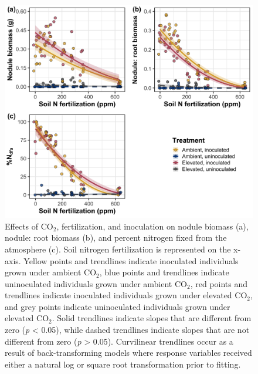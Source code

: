 \newpage
\begin{figure}
    \centering
    \includegraphics[scale = 0.074]{ch5_NxCO2xI/figs/NxCO2xI_fig5_nFix.png}
    \caption[Effects of CO$_2$, fertilization, and inoculation on nodule biomass, nodule: root biomass, and percent nitrogen fixed from the atmosphere.]{Effects of CO$_2$, fertilization, and inoculation on nodule biomass (a), nodule: root biomass (b), and percent nitrogen fixed from the atmosphere (c). Soil nitrogen fertilization is represented on the x-axis. Yellow points and trendlines indicate inoculated individuals grown under ambient CO$_2$, blue points and trendlines indicate uninoculated individuals grown under ambient CO$_2$, red points and trendlines indicate inoculated individuals grown under elevated CO$_2$, and grey points indicate uninoculated individuals grown under elevated CO$_2$. Solid trendlines indicate slopes that are different from zero (\textit{p} < 0.05), while dashed trendlines indicate slopes that are not different from zero (\textit{p} > 0.05). Curvilinear trendlines occur as a result of back-transforming models where response variables received either a natural log or square root transformation prior to fitting. }
    \label{fig:figure5.5}
\end{figure}
\clearpage

